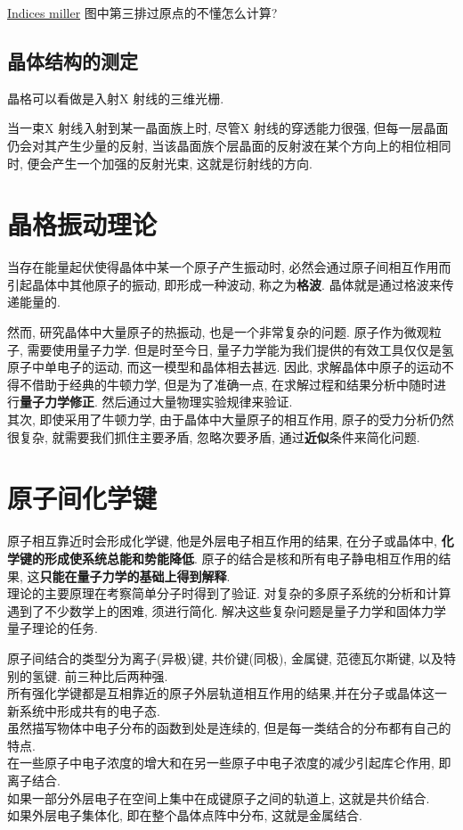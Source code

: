 \documentclass[openany]{article}
\begin{document}
\href{http://upload.wikimedia.org/wikipedia/commons/thumb/d/d5/Miller_Indices_Felix_Kling.svg/411px-Miller_Indices_Felix_Kling.svg.png}{Indices miller}
图中第三排过原点的不懂怎么计算?

\subsection{晶体结构的测定}
晶格可以看做是入射X 射线的三维光栅.

当一束X 射线入射到某一晶面族上时, 尽管X 射线的穿透能力很强,
但每一层晶面仍会对其产生少量的反射,
当该晶面族个层晶面的反射波在某个方向上的相位相同时,
便会产生一个加强的反射光束, 这就是衍射线的方向.

\section{晶格振动理论}
当存在能量起伏使得晶体中某一个原子产生振动时,
必然会通过原子间相互作用而引起晶体中其他原子的振动, 即形成一种波动, 称之为\textbf{格波}. 晶体就是通过格波来传递能量的.

然而, 研究晶体中大量原子的热振动, 也是一个非常复杂的问题.
原子作为微观粒子, 需要使用量子力学. 但是时至今日, 量子力学能为我们提供的有效工具仅仅是氢原子中单电子的运动, 而这一模型和晶体相去甚远. 因此,
求解晶体中原子的运动不得不借助于经典的牛顿力学, 但是为了准确一点, 在求解过程和结果分析中随时进行\textbf{量子力学修正}.
然后通过大量物理实验规律来验证.\\
其次, 即使采用了牛顿力学, 由于晶体中大量原子的相互作用, 原子的受力分析仍然很复杂, 就需要我们抓住主要矛盾, 忽略次要矛盾, 通过\textbf{近似}条件来简化问题.

\section{原子间化学键}
原子相互靠近时会形成化学键, 他是外层电子相互作用的结果, 在分子或晶体中,
\textbf{化学键的形成使系统总能和势能降低}.
原子的结合是核和所有电子静电相互作用的结果,
这\textbf{只能在量子力学的基础上得到解释}.\\理论的主要原理在考察简单分子时得到了验证.
对复杂的多原子系统的分析和计算遇到了不少数学上的困难, 须进行简化.
解决这些复杂问题是量子力学和固体力学量子理论的任务.

原子间结合的类型分为离子(异极)键, 共价键(同极), 金属键, 范德瓦尔斯键, 以及特别的氢键.  前三种比后两种强.\\
所有强化学键都是互相靠近的原子外层轨道相互作用的结果,并在分子或晶体这一新系统中形成共有的电子态.\\
虽然描写物体中电子分布的函数到处是连续的, 但是每一类结合的分布都有自己的特点.\\
在一些原子中电子浓度的增大和在另一些原子中电子浓度的减少引起库仑作用, 即离子结合.\\
如果一部分外层电子在空间上集中在成键原子之间的轨道上, 这就是共价结合.\\
如果外层电子集体化, 即在整个晶体点阵中分布, 这就是金属结合.
\end{document}
